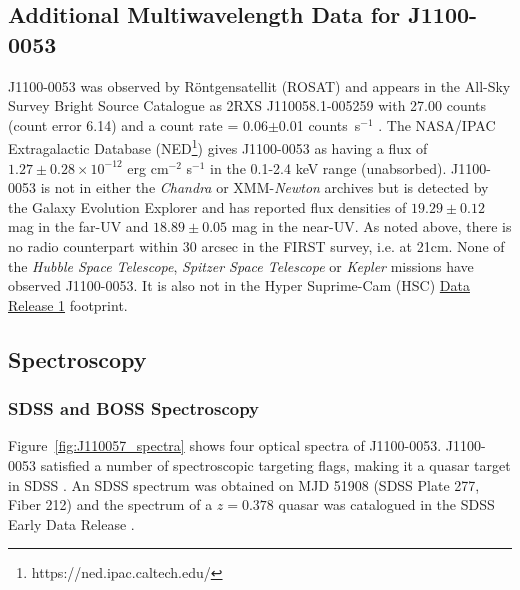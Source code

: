 \documentclass[a4paper,fleqn,usenatbib]{mnras}
\begin{document}
\subsection{Additional Multiwavelength Data for J1100-0053}
J1100-0053 was observed by R\"{o}ntgensatellit (ROSAT) and appears in
the All-Sky Survey Bright Source Catalogue \citep[RASS-BSC;
][]{Appenzeller1998, Voges1999} as 2RXS J110058.1-005259 with 27.00
counts (count error 6.14) and a count rate = 0.06$\pm$0.01
counts~s$^{-1}$ \citep{Boller2016}. The NASA/IPAC Extragalactic
Database (NED\footnote{https://ned.ipac.caltech.edu/}) gives
J1100-0053 as having a flux of $1.27\pm0.28 \times10^{-12}$ erg cm$^{-2}$
s$^{-1}$ in the 0.1-2.4 keV range (unabsorbed). J1100-0053 is not in
either the {\it Chandra} or XMM-{\it Newton} archives but is detected
by the Galaxy Evolution Explorer \citep[GALEX; ][]{Martin2005,
Morrissey2007} and has reported flux densities of $19.29\pm0.12$ mag in
the far-UV and $18.89\pm0.05$ mag in the near-UV. As noted above,
there is no radio counterpart within 30 arcsec in the FIRST survey,
i.e. at 21cm. None of the {\it Hubble Space Telescope}, {\it Spitzer
Space Telescope} or {\it Kepler} missions have observed J1100-0053.
It is also not in the Hyper Suprime-Cam (HSC)
\href{https://hsc-release.mtk.nao.ac.jp/doc/}{Data Release 1}
\citep{Aihara2017} footprint.


\subsection{Spectroscopy}
\subsubsection{SDSS and BOSS Spectroscopy}

Figure~\ref{fig:J110057_spectra} shows four optical spectra of
J1100-0053. J1100-0053 satisfied a number of spectroscopic targeting
flags, making it a quasar target in SDSS \citep{Richards2002}. An SDSS
spectrum was obtained on MJD 51908 (SDSS Plate 277, Fiber 212) and the
spectrum of a $z=0.378$ quasar was catalogued in the SDSS Early Data
Release \citep{Stoughton2002, Schneider2002}. 
\end{document}

